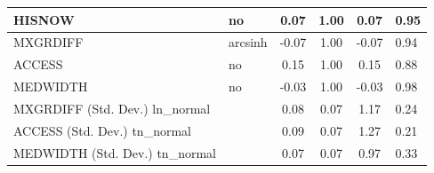 \begin{table}
\begin{center}
\begin{tabular}{|l|l|c|c|c|l|}
			\hline
			HISNOW & no & 0.07 & 1.00 & 0.07 & 0.95 \\
			\hline
			MXGRDIFF & arcsinh & -0.07 & 1.00 & -0.07 & 0.94 \\
			\hline
			ACCESS & no & 0.15 & 1.00 & 0.15 & 0.88 \\
			\hline
			MEDWIDTH & no & -0.03 & 1.00 & -0.03 & 0.98 \\
			\hline
			MXGRDIFF (Std. Dev.) ln_normal &  & 0.08 & 0.07 & 1.17 & 0.24 \\
			\hline
			ACCESS (Std. Dev.) tn_normal &  & 0.09 & 0.07 & 1.27 & 0.21 \\
			\hline
			MEDWIDTH (Std. Dev.) tn_normal &  & 0.07 & 0.07 & 0.97 & 0.33 \\
			\hline
		\end{tabular}
	\end{center}
\end{table}